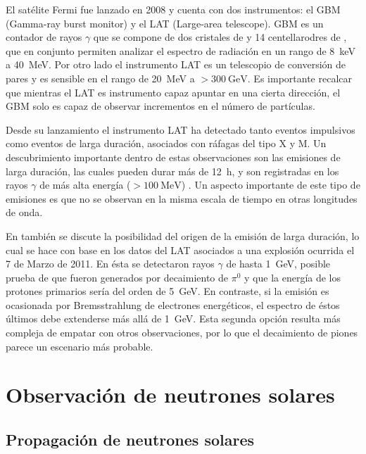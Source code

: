 El satélite Fermi fue lanzado en \num{2008} y cuenta con dos instrumentos: el GBM (Gamma-ray burst monitor) y el LAT (Large-area telescope). GBM es un contador de rayos $\gamma$ que se compone de dos cristales de  y \num{14} centellarodres de , que en conjunto permiten analizar el espectro de radiación en un rango de \SI{8}{\kilo\electronvolt} a \SI{40}{\mega\electronvolt}. Por otro lado el instrumento LAT es un telescopio de conversión de pares y es sensible en el rango de \SI{20}{\mega\electronvolt} a $>\SI{300}{\giga\electronvolt}$. Es importante recalcar que mientras el LAT es instrumento capaz apuntar en una cierta dirección, el GBM solo es capaz de observar incrementos en el número de partículas.

Desde su lanzamiento el instrumento LAT ha detectado tanto eventos impulsivos como eventos de larga duración, asociados con ráfagas del tipo X y M. Un descubrimiento importante dentro de estas observaciones son las emisiones de larga duración, las cuales pueden durar más de \SI{12}{\hour}, y son registradas en los rayos $\gamma$ de más alta energía ($>\SI{100}{\mega\electronvolt}$) \cite{ackermann14}. Un aspecto importante de este tipo de emisiones es que no se observan en la misma escala de tiempo en otras longitudes de onda.

En \cite{ackermann14} también se discute la posibilidad del origen de la emisión de larga duración, lo cual se hace con base en los datos del LAT asociados a una explosión ocurrida el \num{7} de Marzo de \num{2011}. En ésta se detectaron rayos $\gamma$ de hasta \SI{1}{\giga\electronvolt}, posible prueba de que fueron generados por decaimiento de $\pi^{0}$ y que la energía de los protones primarios sería del orden de \SI{5}{\giga\electronvolt}. En contraste, si la emisión es ocasionada por Bremsstrahlung de electrones energéticos, el espectro de éstos últimos debe extenderse más allá de \SI{1}{\giga\electronvolt}. Esta segunda opción resulta más compleja de empatar con otros observaciones, por lo que el decaimiento de piones parece un escenario más probable.

\section{Observación de neutrones solares}
\subsection{Propagación de neutrones solares}

